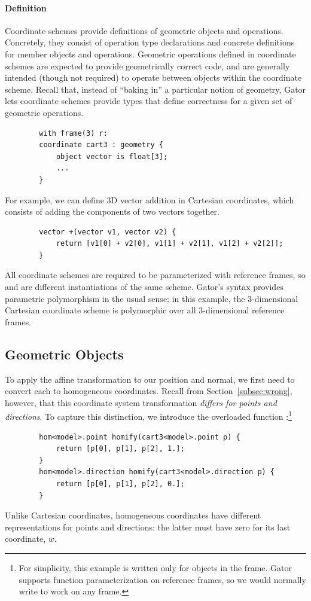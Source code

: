 \documentclass[../main.tex]{subfiles}
\begin{document}
	\paragraph{Definition}
	Coordinate schemes provide definitions of geometric objects and operations.
	Concretely, they consist of operation type declarations and concrete definitions for member objects and operations.
	Geometric operations defined in coordinate schemes are expected to provide geometrically correct code, and are generally intended (though not required) to operate between objects within the coordinate scheme.
	Recall that, instead of ``baking in'' a particular notion of geometry, Gator lets coordinate schemes provide types that define correctness for a given set of geometric operations.
	\begin{lstlisting}
		with frame(3) r:
		coordinate cart3 : geometry {
			object vector is float[3];
			...
		}
	\end{lstlisting}
	For example, we can define 3D vector addition in Cartesian coordinates, which consists of adding the components of two vectors together.
	\begin{lstlisting}
		vector +(vector v1, vector v2) {
			return [v1[0] + v2[0], v1[1] + v2[1], v1[2] + v2[2]];
		}
	\end{lstlisting}
	All coordinate schemes are required to be parameterized with reference frames, so  and  are different instantiations of the same scheme.
	Gator's  syntax provides parametric polymorphism in the usual sense; in this example, the 3-dimensional Cartesian coordinate scheme is polymorphic over all 3-dimensional reference frames.
	
	\subsection{Geometric Objects}
	\label{subsec:objects}
	
	To apply the  affine transformation to our position and normal, we first need to convert each to homogeneous coordinates.  Recall from Section~\ref{subsec:wrong}, however, that this coordinate system transformation \emph{differs for points and directions}.
	To capture this distinction, we introduce the overloaded function :\footnote{For simplicity, this example  is written only for objects in the  frame.  Gator supports function parameterization on reference frames, so we would normally write  to work on any frame.}
	\begin{lstlisting}
		hom<model>.point homify(cart3<model>.point p) {
			return [p[0], p[1], p[2], 1.]; 
		} 
		hom<model>.direction homify(cart3<model>.direction p) {
			return [p[0], p[1], p[2], 0.]; 
		}
	\end{lstlisting}
	Unlike Cartesian coordinates, homogeneous coordinates have different representations for points and directions: the latter must have zero for its last coordinate, $w$.
	
\end{document}
